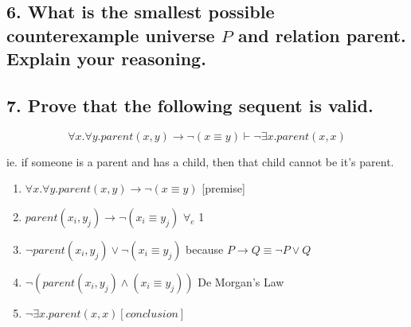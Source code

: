 \documentclass[a4paper, 13pt, draft]{report}
\begin{document}
\subsection*{6. What is the smallest possible counterexample universe $ P $ and relation parent. Explain your reasoning.}

\subsection*{7. Prove that the following sequent is valid.}

\[
	\forall{x}.\forall{y}.parent(x, y) \rightarrow \neg(x \equiv y) \vdash \neg \exists{x}.parent(x, x)
\]

ie. if someone is a parent and has a child, then that child cannot be it's parent.

\begin{enumerate}		
	\item $ \forall{x}.\forall{y}.parent(x, y) \rightarrow \neg(x \equiv y) $ [premise] \\
	\hline
	\item $ parent(x_i, y_j) \rightarrow \neg (x_i \equiv y_j)  $ $ \forall_e $ 1
	\item $ \neg parent(x_i, y_j) \vee \neg (x_i \equiv y_j) $  because $ P \rightarrow Q \equiv \neg P \vee Q $
	\item $ \neg (parent(x_i, y_j) \wedge (x_i \equiv y_j)) $  De Morgan's Law \\
	\hline
	\item $ \neg \exists{x}.parent(x, x) [conclusion] $
\end{enumerate}		
\end{document}
